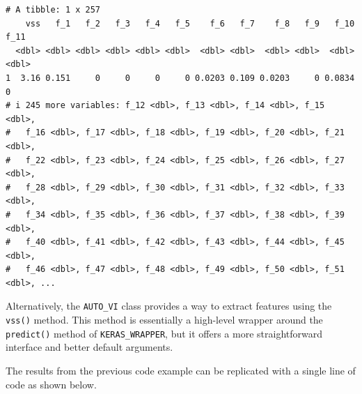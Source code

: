 \documentclass[
doublespace,
  times]{anzsauth}
\newenvironment{Shaded}{\begin{snugshade}}{\end{snugshade}}
\newcommand{\AttributeTok}[1]{\textcolor[rgb]{0.40,0.45,0.13}{#1}}
\newcommand{\FunctionTok}[1]{\textcolor[rgb]{0.28,0.35,0.67}{#1}}
\newcommand{\NormalTok}[1]{\textcolor[rgb]{0.00,0.23,0.31}{#1}}
\newcommand{\SpecialCharTok}[1]{\textcolor[rgb]{0.37,0.37,0.37}{#1}}
\newcommand{\StringTok}[1]{\textcolor[rgb]{0.13,0.47,0.30}{#1}}
\begin{document}
\begin{Shaded}
\end{Shaded}

\begin{verbatim}
# A tibble: 1 x 257
    vss   f_1   f_2   f_3   f_4   f_5    f_6   f_7    f_8   f_9   f_10  f_11
  <dbl> <dbl> <dbl> <dbl> <dbl> <dbl>  <dbl> <dbl>  <dbl> <dbl>  <dbl> <dbl>
1  3.16 0.151     0     0     0     0 0.0203 0.109 0.0203     0 0.0834     0
# i 245 more variables: f_12 <dbl>, f_13 <dbl>, f_14 <dbl>, f_15 <dbl>,
#   f_16 <dbl>, f_17 <dbl>, f_18 <dbl>, f_19 <dbl>, f_20 <dbl>, f_21 <dbl>,
#   f_22 <dbl>, f_23 <dbl>, f_24 <dbl>, f_25 <dbl>, f_26 <dbl>, f_27 <dbl>,
#   f_28 <dbl>, f_29 <dbl>, f_30 <dbl>, f_31 <dbl>, f_32 <dbl>, f_33 <dbl>,
#   f_34 <dbl>, f_35 <dbl>, f_36 <dbl>, f_37 <dbl>, f_38 <dbl>, f_39 <dbl>,
#   f_40 <dbl>, f_41 <dbl>, f_42 <dbl>, f_43 <dbl>, f_44 <dbl>, f_45 <dbl>,
#   f_46 <dbl>, f_47 <dbl>, f_48 <dbl>, f_49 <dbl>, f_50 <dbl>, f_51 <dbl>, ...
\end{verbatim}

Alternatively, the \texttt{AUTO\_VI} class provides a way to extract
features using the \texttt{vss()} method. This method is essentially a
high-level wrapper around the \texttt{predict()} method of
\texttt{KERAS\_WRAPPER}, but it offers a more straightforward interface
and better default arguments.

The results from the previous code example can be replicated with a
single line of code as shown below.

\begin{Shaded}
\end{Shaded}
\end{document}
